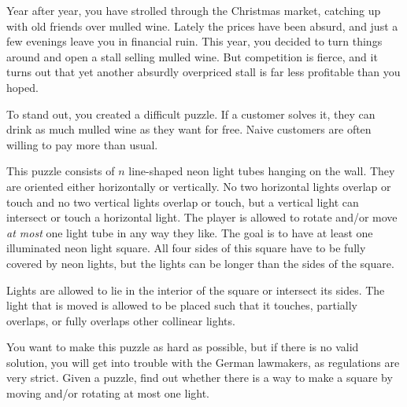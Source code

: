 

\newcommand{\maxt}{20\,000}
\newcommand{\maxn}{2 \cdot 10^5}
\newcommand{\maxcoord}{10^9}

Year after year, you have strolled through the Christmas market, catching up with old friends over mulled wine.
Lately the prices have been absurd, and just a few evenings leave you in financial ruin.
This year, you decided to turn things around and open a stall selling mulled wine.
But competition is fierce, and it turns out that yet another absurdly overpriced stall is far less profitable than you hoped.

To stand out, you created a difficult puzzle.
If a customer solves it, they can drink as much mulled wine as they want for free.
Naive customers are often willing to pay more than usual.

This puzzle consists of $n$ line-shaped neon light tubes hanging on the wall.
They are oriented either horizontally or vertically.
No two horizontal lights overlap or touch and no two vertical lights overlap or touch, but a vertical light can intersect or touch a horizontal light.
The player is allowed to rotate and/or move \emph{at most} one light tube in any way they like.
The goal is to have at least one illuminated neon light square.
All four sides of this square have to be fully covered by neon lights, but the lights can be longer than the sides of the square.

Lights are allowed to lie in the interior of the square or intersect its sides.
The light that is moved is allowed to be placed such that it touches,
partially overlaps, or fully overlaps other collinear lights.

You want to make this puzzle as hard as possible, but if there is no valid solution, you will get into trouble with the German lawmakers, as regulations are very strict.
Given a puzzle, find out whether there is a way to make a square by moving and/or rotating at most one light.

